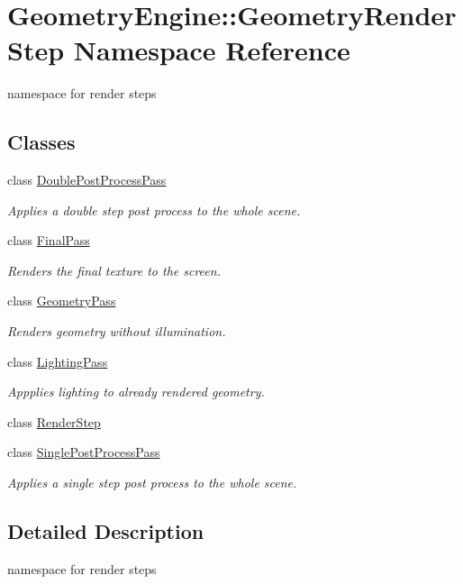 \hypertarget{namespace_geometry_engine_1_1_geometry_render_step}{}\section{Geometry\+Engine\+::Geometry\+Render\+Step Namespace Reference}
\label{namespace_geometry_engine_1_1_geometry_render_step}


namespace for render steps  


\subsection*{Classes}
\begin{DoxyCompactItemize}
\item 
class \mbox{\hyperlink{class_geometry_engine_1_1_geometry_render_step_1_1_double_post_process_pass}{Double\+Post\+Process\+Pass}}
\begin{DoxyCompactList}\small\item\em Applies a double step post process to the whole scene. \end{DoxyCompactList}\item 
class \mbox{\hyperlink{class_geometry_engine_1_1_geometry_render_step_1_1_final_pass}{Final\+Pass}}
\begin{DoxyCompactList}\small\item\em Renders the final texture to the screen. \end{DoxyCompactList}\item 
class \mbox{\hyperlink{class_geometry_engine_1_1_geometry_render_step_1_1_geometry_pass}{Geometry\+Pass}}
\begin{DoxyCompactList}\small\item\em Renders geometry without illumination. \end{DoxyCompactList}\item 
class \mbox{\hyperlink{class_geometry_engine_1_1_geometry_render_step_1_1_lighting_pass}{Lighting\+Pass}}
\begin{DoxyCompactList}\small\item\em Appplies lighting to already rendered geometry. \end{DoxyCompactList}\item 
class \mbox{\hyperlink{class_geometry_engine_1_1_geometry_render_step_1_1_render_step}{Render\+Step}}
\item 
class \mbox{\hyperlink{class_geometry_engine_1_1_geometry_render_step_1_1_single_post_process_pass}{Single\+Post\+Process\+Pass}}
\begin{DoxyCompactList}\small\item\em Applies a single step post process to the whole scene. \end{DoxyCompactList}\end{DoxyCompactItemize}


\subsection{Detailed Description}
namespace for render steps 